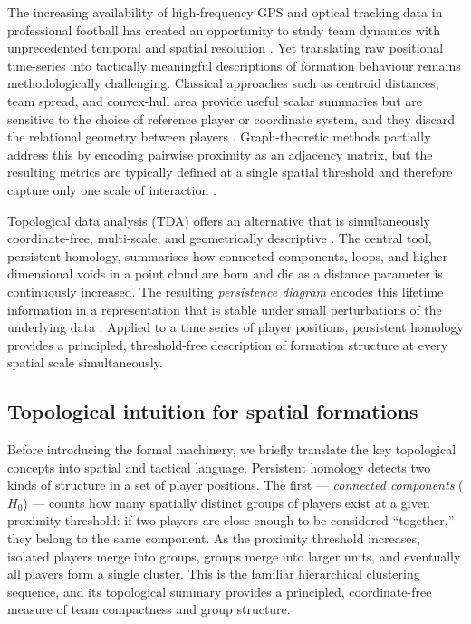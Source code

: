 \documentclass[11pt,a4paper]{article}
\begin{document}
The increasing availability of high-frequency GPS and optical
tracking data in professional football has created an
opportunity to study team dynamics with unprecedented
temporal and spatial resolution \citep{Cummins2013,Aughey2011}.
Yet translating raw positional time-series into
tactically meaningful descriptions of formation behaviour
remains methodologically challenging.  Classical approaches
such as centroid distances, team spread, and convex-hull
area provide useful scalar summaries but are sensitive to
the choice of reference player or coordinate system, and
they discard the relational geometry between players
\citep{Duarte2012,Folgado2014}.  Graph-theoretic methods
partially address this by encoding pairwise proximity as an
adjacency matrix, but the resulting metrics are typically
defined at a single spatial threshold and therefore capture
only one scale of interaction \citep{Clemente2015}.

Topological data analysis (TDA) offers an alternative that
is simultaneously coordinate-free, multi-scale, and
geometrically descriptive \citep{Carlsson2009}.  The central
tool, persistent homology, summarises how connected
components, loops, and higher-dimensional voids in a point
cloud are born and die as a distance parameter is
continuously increased.  The resulting \emph{persistence
diagram} encodes this lifetime information in a
representation that is stable under small perturbations of
the underlying data \citep{CohenSteiner2007}.  Applied to
a time series of player positions, persistent homology
provides a principled, threshold-free description of
formation structure at every spatial scale simultaneously.

\subsection{Topological intuition for spatial formations}
\label{sec:intuition}

Before introducing the formal machinery, we briefly translate
the key topological concepts into spatial and tactical
language.  Persistent homology detects two kinds of structure
in a set of player positions.  The first ---
\emph{connected components} (\(H_0\)) --- counts how many
spatially distinct groups of players exist at a given
proximity threshold: if two players are close enough to be
considered ``together,'' they belong to the same component.
As the proximity threshold increases, isolated players merge
into groups, groups merge into larger units, and eventually
all players form a single cluster.  This is the familiar
hierarchical clustering sequence, and its topological summary
provides a principled, coordinate-free measure of team
compactness and group structure.
\end{document}

